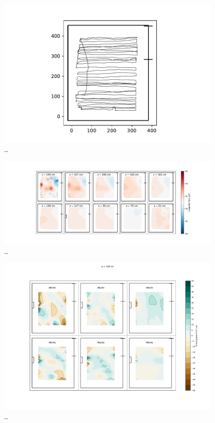 \begin{figure}
  \centering
  \includegraphics[width=0.9\linewidth]{gfx/mapping/lpsc/bastille_crane_away_rep_track.pdf}
  \caption{\ldots}
  \label{fig:mapping_bastille_track}
\end{figure}

\begin{figure}
  \centering
  \includegraphics[width=0.9\linewidth]{gfx/mapping/lpsc/bastille_crane_away_rep_magnitude.pdf}
  \caption{\ldots}
  \label{fig:mapping_bastille_magnitude}
\end{figure}

\begin{figure}
  \centering
  \includegraphics[width=0.9\linewidth]{gfx/mapping/lpsc/bastille_crane_away_rep_gradient_139cm.pdf}
  \caption{\ldots}
  \label{fig:mapping_bastille_magnitude}
\end{figure}

